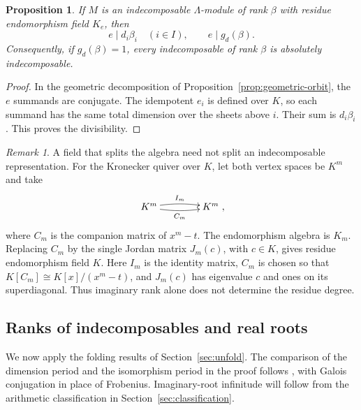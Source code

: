 \documentclass[11pt, reqno]{amsart}
\numberwithin{equation}{section}
\newtheorem{proposition}[theorem]{Proposition}
\theoremstyle{definition}
\theoremstyle{remark}
\newtheorem{remark}[theorem]{Remark}
\newcommand{\iso}{\cong}
\newcommand{\quiverdiagram}[1]{\vcenter{\hbox{$\displaystyle #1$}}}
\begin{document}
\begin{proposition}\label{prop:divisibility}
If $M$ is an indecomposable $\Lambda$-module of rank $\beta$ with
residue endomorphism field $K_e$, then
\[ e\mid d_i\beta_i\quad(i\in I),\qquad e\mid g_d(\beta). \]
Consequently, if $g_d(\beta)=1$, every indecomposable of rank $\beta$
is absolutely indecomposable.
\end{proposition}
\begin{proof}
In the geometric decomposition of Proposition~\ref{prop:geometric-orbit},
the $e$ summands are conjugate. The idempotent $e_i$ is defined over
$K$, so each summand has the same total dimension over the sheets
above $i$. Their sum is $d_i\beta_i$. This proves the divisibility.
\end{proof}

\begin{remark}\label{rem:kronecker}
A field that splits the algebra need not split an indecomposable
representation. For the Kronecker quiver over $K$, let both vertex
spaces be $K^m$ and take
\[ \quiverdiagram{\xymatrix@C=4em{K^m\ar@/^0.29pc/[r]^{I_m}\ar@/_0.29pc/[r]_{C_m}&K^m}}, \]
where $C_m$ is the companion matrix of $x^m-t$. The endomorphism
algebra is $K_m$.
Replacing $C_m$ by the single Jordan matrix $J_m(c)$, with $c\in K$,
gives residue endomorphism field $K$. Here $I_m$ is the identity
matrix, $C_m$ is chosen so that $K[C_m]\iso K[x]/(x^m-t)$, and
$J_m(c)$ has eigenvalue $c$ and ones on its superdiagonal. Thus
imaginary rank alone does not determine the residue degree.
\end{remark}

\subsection{Ranks of indecomposables and real roots}\label{sec:root}
We now apply the folding results of Section~\ref{sec:unfold}.
The comparison of the dimension period and the isomorphism period
in the proof follows \cite[Proposition~10.2]{DengDu}, with Galois
conjugation in place of Frobenius. Imaginary-root infinitude will follow
from the arithmetic classification in Section~\ref{sec:classification}.
\end{document}
